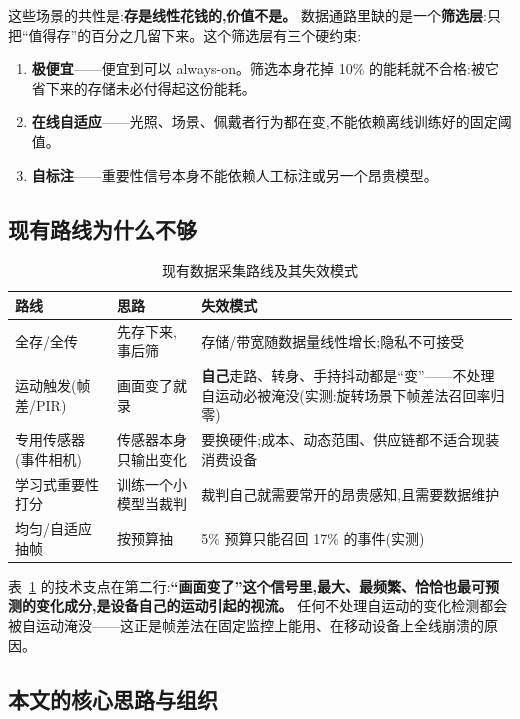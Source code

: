 \documentclass[UTF8,12pt,a4paper]{ctexart}
\begin{document}
这些场景的共性是:\textbf{存是线性花钱的,价值不是。} 数据通路里缺的是一个\textbf{筛选层}:只把``值得存''的百分之几留下来。这个筛选层有三个硬约束:

\begin{enumerate}
  \item \textbf{极便宜}——便宜到可以 always-on。筛选本身花掉 10\% 的能耗就不合格:被它省下来的存储未必付得起这份能耗。
  \item \textbf{在线自适应}——光照、场景、佩戴者行为都在变,不能依赖离线训练好的固定阈值。
  \item \textbf{自标注}——重要性信号本身不能依赖人工标注或另一个昂贵模型。
\end{enumerate}

\subsection{现有路线为什么不够}

\begin{table}[htbp]
  \centering
  \small
  \caption{现有数据采集路线及其失效模式}
  \label{tab:routes}
  \begin{tabular}{p{3.6cm}p{3.4cm}p{6.6cm}}
    \toprule
    路线 & 思路 & 失效模式 \\
    \midrule
    全存/全传 & 先存下来,事后筛 & 存储/带宽随数据量线性增长;隐私不可接受 \\
    运动触发(帧差/PIR) & 画面变了就录 & \textbf{自己}走路、转身、手持抖动都是``变''——不处理自运动必被淹没(实测:旋转场景下帧差法召回率归零) \\
    专用传感器(事件相机) & 传感器本身只输出变化 & 要换硬件;成本、动态范围、供应链都不适合现装消费设备 \\
    学习式重要性打分 & 训练一个小模型当裁判 & 裁判自己就需要常开的昂贵感知,且需要数据维护 \\
    均匀/自适应抽帧 & 按预算抽 & 5\% 预算只能召回 17\% 的事件(实测) \\
    \bottomrule
  \end{tabular}
\end{table}

表~\ref{tab:routes} 的技术支点在第二行:\textbf{``画面变了''这个信号里,最大、最频繁、恰恰也最可预测的变化成分,是设备自己的运动引起的视流。} 任何不处理自运动的变化检测都会被自运动淹没——这正是帧差法在固定监控上能用、在移动设备上全线崩溃的原因。

\subsection{本文的核心思路与组织}
\end{document}
